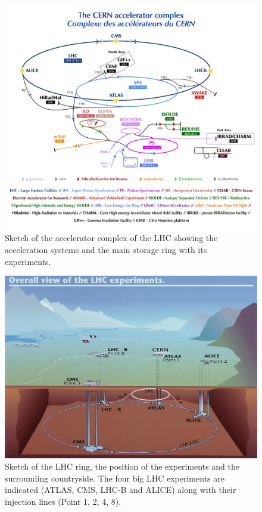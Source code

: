 \begin{figure}[htbp]
\centering
\includegraphics[width=\figwidth]{figures_LHC/CCC-v2018-print-v2.jpg}
\caption[Sketch of the LHC accelerator complex]{Sketch of the accelerator complex of the LHC showing the acceleration systems and the main storage ring with its experiments.~\cite{Mobs:2636343}}
\label{fig:accelerator_complex}
\end{figure}

\begin{figure}[htbp]
  \centering
  \includegraphics[scale=0.4]{figures_LHC/CERN-all-experiments.jpg}
  \caption[Sketch of the LHC ring.]{Sketch of the LHC ring, the position
    of the experiments and the surrounding countryside. The four big
    LHC experiments are indicated (ATLAS, CMS, LHC-B and ALICE) along with their injection lines (Point 1, 2, 4, 8).~\cite{Jean-Luc:841555}}
  \label{fig:LHC}
\end{figure}


